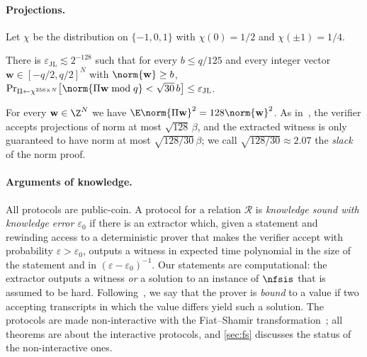 \paragraph{Projections.}
Let $\chi$ be the distribution on $\{-1,0,1\}$ with $\chi(0)=1/2$ and $\chi(\pm1)=1/4$.
\begin{lemma}[{\cite[Lemma~4.2]{BS23}}]\label{lem:jl}
There is $\varepsilon_{\mathrm{JL}}\lesssim2^{-128}$ such that for every $b\le q/125$ and every integer vector $\mathbf w\in[-q/2,q/2]^N$ with $\norm{\mathbf w}\ge b$,
$\Pr_{\Pi\leftarrow\chi^{256\times N}}\bigl[\norm{\Pi\mathbf w\bmod q}<\sqrt{30}\,b\bigr]\le\varepsilon_{\mathrm{JL}}$.
\end{lemma}
For every $\mathbf w\in\Z^N$ we have $\E\norm{\Pi\mathbf w}^2=128\norm{\mathbf w}^2$. As in~\cite{BS23}, the verifier accepts projections of norm at most $\sqrt{128}\,\beta$, and the extracted witness is only guaranteed to have norm at most $\sqrt{128/30}\,\beta$; we call $\sqrt{128/30}\approx2.07$ the \emph{slack} of the norm proof.

\paragraph{Arguments of knowledge.}
All protocols are public-coin. A protocol for a relation $\mathcal R$ is \emph{knowledge sound with knowledge error $\varepsilon_0$} if there is an extractor which, given a statement and rewinding access to a deterministic prover that makes the verifier accept with probability $\varepsilon>\varepsilon_0$, outputs a witness in expected time polynomial in the size of the statement and in $(\varepsilon-\varepsilon_0)^{-1}$. Our statements are computational: the extractor outputs a witness \emph{or} a solution to an instance of $\nfsis$ that is assumed to be hard. Following~\cite{BS23}, we say that the prover is \emph{bound} to a value if two accepting transcripts in which the value differs yield such a solution. The protocols are made non-interactive with the Fiat--Shamir transformation~\cite{FS86}; all theorems are about the interactive protocols, and \cref{sec:fs} discusses the status of the non-interactive ones.
